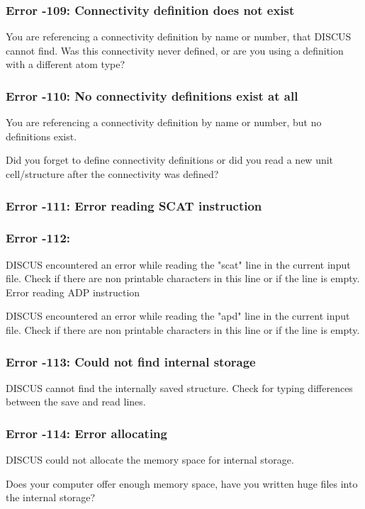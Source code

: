 \subsubsection{Error -109: Connectivity definition does not exist}
\par
You are referencing a connectivity definition by name or number, 
that DISCUS cannot find. 
Was this connectivity never defined, or are you using a definition 
with a different atom type? 
\subsubsection{Error -110: No connectivity definitions exist at all}
\par
You are referencing a connectivity definition by name or number, 
but no definitions exist. 
\par
Did you forget to define connectivity definitions or did you read 
a new unit cell/structure after the connectivity was defined? 
\subsubsection{Error -111: Error reading SCAT instruction}
\subsubsection{Error -112: }
DISCUS encountered an error while reading the "scat" line in the current 
input file. Check if there are non printable characters in this line 
or if the line is empty. 
Error reading ADP  instruction 
\par
DISCUS encountered an error while reading the "apd" line in the current 
input file. Check if there are non printable characters in this line 
or if the line is empty. 
\subsubsection{Error -113: Could not find internal storage}
\par
DISCUS cannot find the internally saved structure. 
Check for typing differences between the save and read lines. 
\subsubsection{Error -114: Error allocating}
\par
DISCUS could not allocate the memory space for internal storage. 
\par
Does your computer offer enough memory space, have you written huge files 
into the internal storage? 
